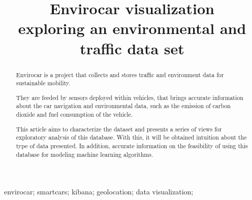 \documentclass[10pt, conference]{IEEEtran}
\begin{document}
%
\title{Envirocar visualization \\ exploring an environmental and traffic data set}

\newif\iffinal
\finaltrue
\newcommand{\jemsid}{99999}


\iffinal
  \author{%
  }
\else
  \author{Sibgrapi paper ID: \jemsid \\ }
\fi


\maketitle


\begin{abstract}
Envirocar is a project that collects and stores traffic and environment data for
sustainable mobility. 

They are feeded by sensors deployed within vehicles, that brings accurate information
about the car navigation and environmental data, such as the emission of carbon dioxide 
and fuel consumption of the vehicle.

This article aims to characterize the dataset and presents a series of
views for exploratory analysis of this database. With this, it will be
obtained intuition about the type of data presented. In addition,
accurate information on the feasibility of using this database for modeling
machine learning algorithms.



%
\end{abstract}

\begin{IEEEkeywords}
envirocar; smartcars; kibana; geolocation; data visualization;

\end{IEEEkeywords}
\end{document}
